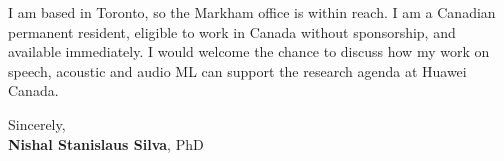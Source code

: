 \documentclass[11pt]{article}
\newcommand{\clName}{Nishal Stanislaus Silva}
\newcommand{\clCompany}{Huawei Canada}
\begin{document}
I am based in Toronto, so the Markham office is within reach. I am a Canadian permanent resident, eligible to work in Canada without sponsorship, and available immediately. I would welcome the chance to discuss how my work on speech, acoustic and audio ML can support the research agenda at \clCompany{}.

\vspace{8pt}
Sincerely,\\[2pt]
\textbf{\clName}, PhD
\end{document}
